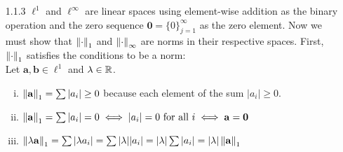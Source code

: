 \documentclass[../../Solutions.tex]{subfiles}
\begin{document}
\begin{itemize}
	\item [1.1.3] $\ell^1$ and $\ell^\infty$ are linear spaces using element-wise addition as the binary operation and the zero sequence $\mathbf{0} = \{0\}_{j=1}^\infty$ as the zero element.
	Now we must show that $\left\lVert\cdot\right\rVert_1$ and $\left\lVert\cdot\right\rVert_\infty$ are norms in their respective spaces.
	First, $\left\lVert\cdot\right\rVert_1$ satisfies the conditions to be a norm: \\
	Let $\mathbf{a},\mathbf{b} \in \ell^1$ and $\lambda \in \mathbb{R}$.
	\begin{enumerate}[(i)]
		\item $\left\lVert\mathbf{a}\right\rVert_1 = \sum | a_i | \geq 0$ because each element of the sum $|a_i| \geq 0$.
		\item $\left\lVert\mathbf{a}\right\rVert_1 = \sum | a_i | = 0 \iff |a_i| = 0 \text{ for all } i \iff \mathbf{a} = \mathbf{0}$
		\item $\left\lVert\lambda\mathbf{a}\right\rVert_1 = \sum | \lambda a_i | = \sum |\lambda||a_i| = |\lambda|\sum |a_i| = |\lambda|\left\lVert\mathbf{a}\right\rVert_1$
	\end{enumerate}
	
\end{itemize}
\end{document}
